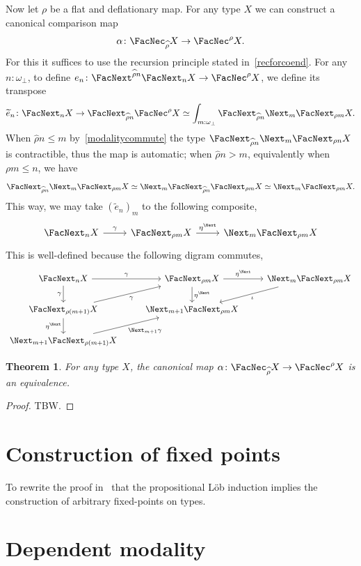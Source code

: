 \documentclass[a4paper,10pt]{amsart}
\newtheorem{theorem}{Theorem}[section]
\theoremstyle{definition}
\newcommand{\pf}[1]{\widehat{#1}}
\newcommand{\qsi}[1]{\widetilde{#1}}
\newcommand{\ovob}{\omega_\bot}
\newcommand{\bx}{\FacNec}
\newcommand{\opm}[1]{\FacNext_{#1}}
\newcommand{\upm}[1]{\FacNext^{#1}}
\newcommand{\clm}[1]{\Next_{#1}}
\newcommand{\clmm}{\Next}
\begin{document}
Now let $\rho$ be a flat and deflationary map. For any type $X$ we can construct a canonical comparison map
\[ \alpha \colon \bx_{\pf\rho}X \to \bx^\rho X. \]
For this it suffices to use the recursion principle stated in~\cref{recforcoend}. For any $n:\ovob$, to define $e_n \colon \upm{\pf\rho n}\opm nX \to \bx^\rho X$, we define its transpose
\[ \qsi e_n \colon \opm nX \to \opm{\pf\rho n}\bx^\rho X \simeq \int_{m:\ovob}\opm{\pf\rho n}\clm m\opm{\rho m}X. \]
When $\pf\rho n \le m$ by~\cref{modalitycommute} the type $\opm{\pf\rho n}\clm m\opm{\rho n}X$ is contractible, thus the map is automatic; when $\pf\rho n > m$, equivalently when $\rho m \le n$, we have
\[ \opm{\pf\rho n}\clm m\opm{\rho m}X \simeq \clm m\opm{\pf\rho n}\opm{\rho m}X \simeq \clm m\opm{\rho m}X. \]
This way, we may take $(\qsi e_n)_m$ to the following composite,
\[
\begin{tikzcd}
  \opm nX \ar[r, "\gamma"] & \opm{\rho m}X \ar[r, "\eta^\clmm"] & \clm m\opm{\rho m}X
\end{tikzcd}
\]
This is well-defined because the following digram commutes,
\[\begin{tikzcd}
	{\opm nX} & {\opm{\rho m}X} & {\clm m\opm{\rho m}X} \\
	{\opm{\rho(m+1)}X} & {\clm{m+1}\opm{\rho m}X} \\
	{\clm{m+1}\opm{\rho(m+1)}X}
	\arrow["\gamma", from=1-1, to=1-2]
	\arrow["\gamma"', from=1-1, to=2-1]
	\arrow["{\eta^{\clmm}}", from=1-2, to=1-3]
	\arrow["{\eta^{\clmm}}", from=1-2, to=2-2]
	\arrow["\iota", from=1-3, to=2-2]
	\arrow["\gamma"', from=2-1, to=1-2]
	\arrow["{\eta^{\clmm}}"', from=2-1, to=3-1]
	\arrow["{\clm{m+1}\gamma}"', from=3-1, to=2-2]
\end{tikzcd}\]


\begin{theorem}
  For any type $X$, the canonical map $\alpha \colon \bx_{\pf\rho}X \to \bx^\rho X$ is an equivalence.
\end{theorem}
\begin{proof}
  TBW.
\end{proof}

\section{Construction of fixed points}

To rewrite the proof in~\cite{gratzer2025modal} that the propositional L\"ob induction implies the construction of arbitrary fixed-points on types.

\section{Dependent modality}
\end{document}
